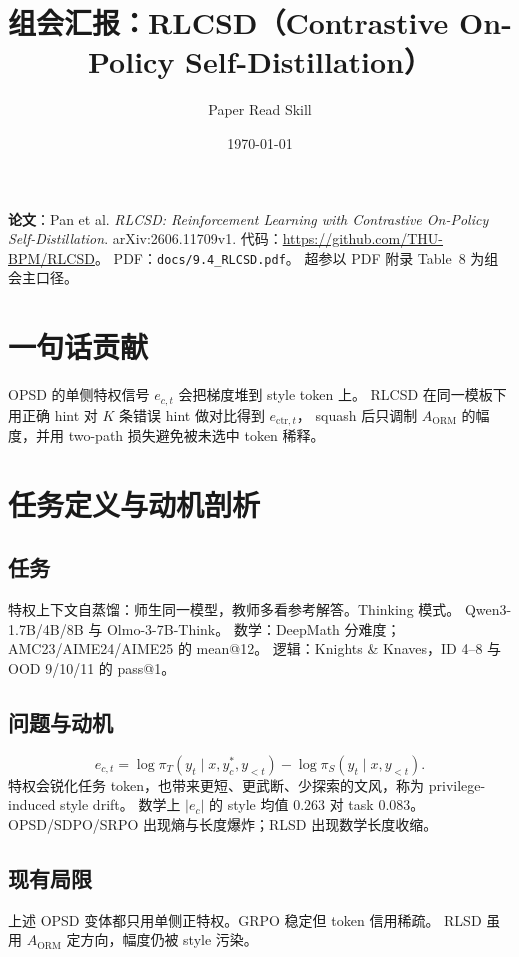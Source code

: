 \documentclass[11pt,a4paper]{ctexart}
\title{组会汇报：RLCSD（Contrastive On-Policy Self-Distillation）}
\author{Paper Read Skill}
\date{\today}
\begin{document}
\maketitle
\tableofcontents
\newpage

\noindent\textbf{论文}：Pan et al.
\textit{RLCSD: Reinforcement Learning with Contrastive On-Policy Self-Distillation}.
arXiv:2606.11709v1.
代码：\url{https://github.com/THU-BPM/RLCSD}。
PDF：\texttt{docs/9.4\_RLCSD.pdf}。
超参以 PDF 附录 Table~8 为组会主口径。

\section{一句话贡献}
OPSD 的单侧特权信号 $e_{c,t}$ 会把梯度堆到 style token 上。
RLCSD 在同一模板下用正确 hint 对 $K$ 条错误 hint 做对比得到 $e_{\mathrm{ctr},t}$，
squash 后只调制 $A_{\mathrm{ORM}}$ 的幅度，并用 two-path 损失避免被未选中 token 稀释。

\section{任务定义与动机剖析}

\subsection{任务}
特权上下文自蒸馏：师生同一模型，教师多看参考解答。Thinking 模式。
Qwen3-1.7B/4B/8B 与 Olmo-3-7B-Think。
数学：DeepMath 分难度；AMC23/AIME24/AIME25 的 mean@12。
逻辑：Knights \& Knaves，ID 4--8 与 OOD 9/10/11 的 pass@1。

\subsection{问题与动机}
\begin{equation}
e_{c,t}=\log\pi_T(y_t\mid x,y_c^\ast,y_{<t})-\log\pi_S(y_t\mid x,y_{<t}).
\end{equation}
特权会锐化任务 token，也带来更短、更武断、少探索的文风，称为 privilege-induced style drift。
数学上 $|e_c|$ 的 style 均值 $0.263$ 对 task $0.083$。
OPSD/SDPO/SRPO 出现熵与长度爆炸；RLSD 出现数学长度收缩。

\subsection{现有局限}
上述 OPSD 变体都只用单侧正特权。GRPO 稳定但 token 信用稀疏。
RLSD 虽用 $A_{\mathrm{ORM}}$ 定方向，幅度仍被 style 污染。
\end{document}
